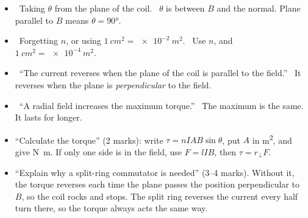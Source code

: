 \begin{mistakes}
\begin{itemize}
  \item \xmark\ Taking $\theta$ from the plane of the coil. \cmark\ $\theta$ is between
        $B$ and the normal. Plane parallel to $B$ means $\theta = \ang{90}$.
  \item \xmark\ Forgetting $n$, or using $\qty{1}{cm^2} = \qty{e-2}{m^2}$. \cmark\ Use $n$, and
        $\qty{1}{cm^2} = \qty{e-4}{m^2}$.
  \item \xmark\ ``The current reverses when the plane of the coil is parallel to the
        field.'' \cmark\ It reverses when the plane is \emph{perpendicular} to the field.
  \item \xmark\ ``A radial field increases the maximum torque.'' \cmark\ The maximum is
        the same. It lasts for longer.
\end{itemize}
\end{mistakes}

\begin{examtip}
\begin{itemize}
  \item ``Calculate the torque'' (2 marks): write $\tau = nIAB\sin\theta$, put $A$ in
        \si{m^2}, and give \si{N.m}. If only one side is in the field, use $F = lIB$,
        then $\tau = r_\perp F$.
  \item ``Explain why a split-ring commutator is needed'' (3--4 marks). Without it,
        the torque reverses each time the plane passes the position perpendicular to
        $B$, so the coil rocks and stops. The split ring reverses the current every half
        turn there, so the torque always acts the same way.
\end{itemize}
\end{examtip}

